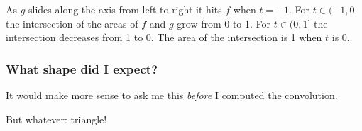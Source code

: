 As $g$ slides along the axis from left to right it hits $f$ when $t=-1$.
For $t \in (-1, 0]$ the intersection of the areas of $f$ and $g$ grow from 0 to 1.
For $t \in (0, 1]$ the intersection decreases from 1 to 0.
The area of the intersection is 1 when $t$ is 0.

\subsubsection{What shape did I expect?}
It would make more sense to ask me this \textit{before} I computed the convolution.

But whatever: triangle!


